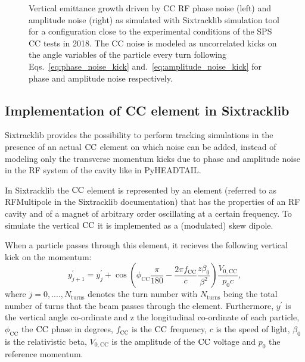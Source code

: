 \begin{figure}[htp]
\begin{subfigure}{.45\textwidth}
    \end{subfigure}
    \caption{Vertical emittance growth driven by CC RF phase noise (left) and amplitude noise (right) as simulated with Sixtracklib simulation tool for a configuration close to the experimental conditions of the SPS CC tests in 2018. The CC noise is modeled as uncorrelated kicks on the angle variables of the particle every turn following Eqs.~\eqref{eq:phase_noise_kick} and.~\eqref{eq:amplitude_noise_kick} for phase and amplitude noise respectively.}
    \label{fig:study_1_sixtracklib_normalised_momentum_kicks}
\end{figure}


\newpage

\subsection{Implementation of CC element in Sixtracklib}\label{subsec:sixtracklig_CC_implementation}
Sixtracklib provides the possibility to perform tracking simulations in the presence of an actual ${\mathrm{CC}}$ element on which noise can be added, instead of modeling only the transverse momentum kicks due to phase and amplitude noise in the RF system of the cavity like in PyHEADTAIL.

In Sixtracklib the ${\mathrm{CC}}$ element is represented by an element (referred to as RFMultipole in the Sixtracklib documentation) that has the properties of an RF cavity and of a magnet of arbitrary order oscillating at a certain frequency. To simulate the vertical ${\mathrm{CC}}$ it is implemented as a (modulated) skew dipole.

When a particle passes through this element, it recieves the following vertical kick on the momentum:
\begin{equation}\label{eq:CC_kick_sixtracklib_vertical}
    y^\prime_{j+1} = y^\prime_{j} + \cos{\left ( \phi_\mathrm{CC} \frac{\pi}{180} - \frac{2\pi f_\mathrm{CC}}{c} \frac{z \beta_0}{\beta^2} \right )} \frac{V_\mathrm{0,CC}}{p_0 c},
\end{equation}
where $j={0, ...., N_\mathrm{turns}}$ denotes the turn number with $N_\mathrm{turns}$ being the total number of turns that the beam passes through the element. Furthermore, $y^\prime$ is the vertical angle co-ordinate and z the longitudinal co-ordinate of each particle, $\phi_\mathrm{CC}$ the ${\mathrm{CC}}$ phase in degrees, $f_\mathrm{CC}$ is the ${\mathrm{CC}}$ frequency, $c$ is the speed of light, $\beta_0$ is the relativistic beta, $V_\mathrm{0,CC}$ is the amplitude of the ${\mathrm{CC}}$ voltage and $p_0$ the reference momentum.


